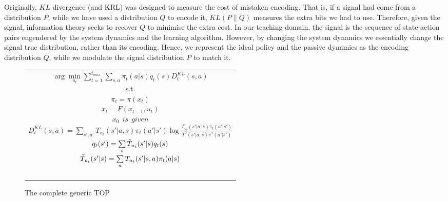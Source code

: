 Originally, $KL$ divergence (and KRL) was designed to measure the cost
of mistaken encoding. That is, if a signal had come from a
distribution $P$, while we have used a distribution $Q$ to encode it,
$KL(P\|Q)$ measures the extra bits we had to
use\cite{cover_thomas_IT_book_91}. Therefore, given the signal,
information theory seeks to recover $Q$ to minimise the extra cost. In
our teaching domain, the signal is the sequence of state-action pairs
engendered by the system dynamics and the learning algorithm. However,
by changing the system dynamics we essentially change the signal true
distribution, rather than its encoding. Hence, we represent the ideal
policy and the passive dynamics as the encoding distribution $Q$,
while we modulate the signal distribution $P$ to match it.

\begin{figure}[ht]
\begin{tabular}{|c|} \hline \parbox{3.2 in} {\center 
$\arg\min\limits_{u_t}\sum\limits_{t=1}^{t_{max}}\sum\limits_{s,a}\pi_t(a|s)q_t(s)D^{KL}_t(s,a)$\\
s.t.\\
$\pi_t=\pi(x_t)$\\
$x_t=F(x_{t-1},u_t)$\\
$x_0\ \ \displaystyle{is\ \ given}$\\
$D^{KL}_t(s,a)=\sum\limits_{s',a'}T_{u_t}(s'|a,s)\pi_t(a'|s')\log\frac{T_{u_t}(s'|a,s)\pi_t(a'|s')}{T^0(s'|a,s)\pi^*(a'|s')}$\\
$q_t(s')=\sum\limits_s\Tilde{T}_{u_t}(s'|s)q_t(s)$\\
$\Tilde{T}_{u_t}(s'|s)=\sum\limits_aT_{u_t}(s'|s,a)\pi_t(a|s)$\\\ \\
}\\ \hline \end{tabular}
\caption{\label{t_opt}The complete generic TOP}
\end{figure}


